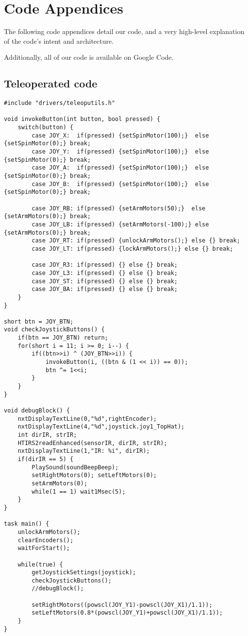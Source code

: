 \section{Code Appendices}
The following code appendices detail our code, and a very high-level explanation of the code's intent and architecture.

Additionally, all of our code is available on Google Code.

\subsection{Teleoperated code}
\begin{lstlisting}
#include "drivers/teleoputils.h"

void invokeButton(int button, bool pressed) {
	switch(button) {
		case JOY_X:  if(pressed) {setSpinMotor(100);}  else {setSpinMotor(0);} break;
		case JOY_Y:  if(pressed) {setSpinMotor(100);}  else {setSpinMotor(0);} break;
		case JOY_A:  if(pressed) {setSpinMotor(100);}  else {setSpinMotor(0);} break;
		case JOY_B:  if(pressed) {setSpinMotor(100);}  else {setSpinMotor(0);} break;

		case JOY_RB: if(pressed) {setArmMotors(50);}  else {setArmMotors(0);} break;
		case JOY_LB: if(pressed) {setArmMotors(-100);} else {setArmMotors(0);} break;
		case JOY_RT: if(pressed) {unlockArmMotors();} else {} break;
		case JOY_LT: if(pressed) {lockArmMotors();} else {} break;

		case JOY_R3: if(pressed) {} else {} break;
		case JOY_L3: if(pressed) {} else {} break;
		case JOY_ST: if(pressed) {} else {} break;
		case JOY_BA: if(pressed) {} else {} break;
	}
}

short btn = JOY_BTN;
void checkJoystickButtons() {
	if(btn == JOY_BTN) return;
	for(short i = 11; i >= 0; i--) {
		if((btn>>i) ^ (JOY_BTN>>i)) {
			invokeButton(i, ((btn & (1 << i)) == 0));
			btn ^= 1<<i;
		}
	}
}

void debugBlock() {
	nxtDisplayTextLine(0,"%d",rightEncoder);
	nxtDisplayTextLine(4,"%d",joystick.joy1_TopHat);
	int dirIR, strIR;
	HTIRS2readEnhanced(sensorIR, dirIR, strIR);
	nxtDisplayTextLine(1,"IR: %i", dirIR);
	if(dirIR == 5) {
		PlaySound(soundBeepBeep);
		setRightMotors(0); setLeftMotors(0);
		setArmMotors(0);
		while(1 == 1) wait1Msec(5);
	}
}

task main() {
	unlockArmMotors();
	clearEncoders();
 	waitForStart();

 	while(true) {
		getJoystickSettings(joystick);
		checkJoystickButtons();
		//debugBlock();

		setRightMotors((powscl(JOY_Y1)-powscl(JOY_X1)/1.1));
		setLeftMotors(0.8*(powscl(JOY_Y1)+powscl(JOY_X1)/1.1));
	}
}
\end{lstlisting}

